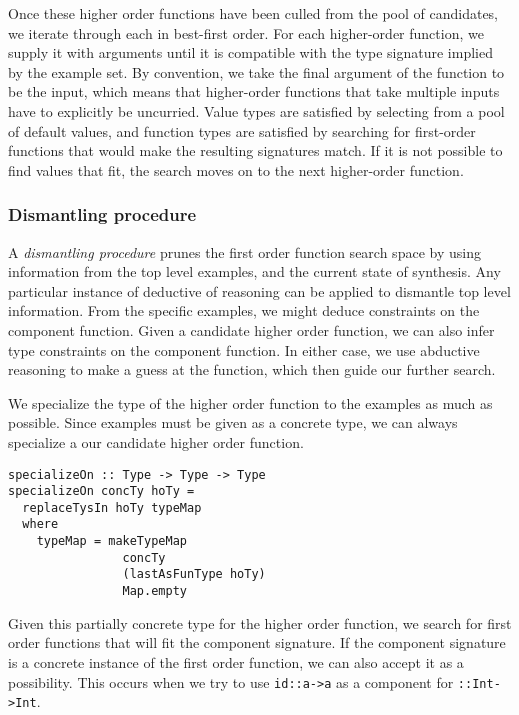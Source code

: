 Once these higher order functions have been culled from the pool of candidates, we iterate through each in best-first order. For each higher-order function, we supply it with arguments until it is compatible with the type signature implied by the example set. By convention, we take the final argument of the function to be the input, which means that higher-order functions that take multiple inputs have to explicitly be uncurried. Value types are satisfied by selecting from a pool of default values, and function types are satisfied by searching for first-order functions that would make the resulting signatures match. If it is not possible to find values that fit, the search moves on to the next higher-order function.

\subsubsection{Dismantling procedure}

A \textit{dismantling procedure} prunes the first order function search space by using information from the top level examples, and the current state of synthesis.
Any particular instance of deductive of reasoning can be applied to dismantle top level information.
From the specific examples, we might deduce constraints on the component function.
Given a candidate higher order function, we can also infer type constraints on the component function.
In either case, we use abductive reasoning to make a guess at the function, which then guide our further search.

We specialize the type of the higher order function to the examples as much as possible.
Since examples must be given as a concrete type, we can always specialize a our candidate higher order function. 

\begin{lstlisting}
specializeOn :: Type -> Type -> Type
specializeOn concTy hoTy =
  replaceTysIn hoTy typeMap
  where
    typeMap = makeTypeMap 
                concTy 
                (lastAsFunType hoTy)
                Map.empty
\end{lstlisting}

Given this partially concrete type for the higher order function, we search for first order functions that will fit the component signature.
If the component signature is a concrete instance of the first order function, we can also accept it as a possibility.
This occurs when we try to use \texttt{id::a->a} as a component for \texttt{::Int->Int}.

